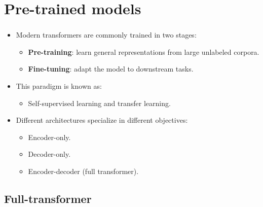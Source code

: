 \documentclass[xcolor=table]{beamer}
\begin{document}
	\section{Pre-trained models}
	
	\begin{frame}
		\frametitle{\insertshortsubtitle}
		\framesubtitle{\insertsection}
		
		\begin{itemize}
			
			\item Modern transformers are commonly trained in two stages:
			\begin{itemize}
				\item \textbf{Pre-training}: learn general representations from large unlabeled corpora.
				\item \textbf{Fine-tuning}: adapt the model to downstream tasks.
			\end{itemize}
			
			\item This paradigm is known as:
			\begin{itemize}
				\item Self-supervised learning and transfer learning.
			\end{itemize}
			
			\item Different architectures specialize in different objectives:
			\begin{itemize}
				\item Encoder-only.
				\item Decoder-only.
				\item Encoder-decoder (full transformer).
			\end{itemize}
			
		\end{itemize}
		
	\end{frame}
	
	\subsection{Full-transformer}
	
\end{document}
